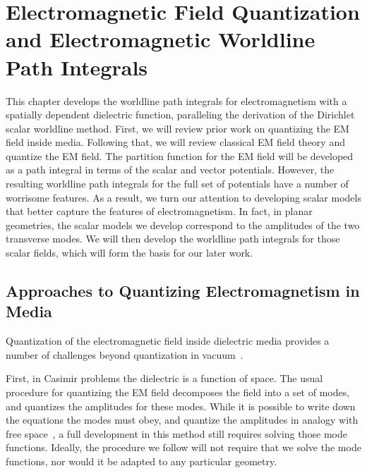 \chapter{Electromagnetic Field Quantization and Electromagnetic Worldline Path Integrals}

\label{ch:EM_quantization}

This chapter develops the worldline path integrals for electromagnetism with a spatially dependent
dielectric function, paralleling the derivation of the Dirichlet scalar worldline method.
First, we will review prior work on quantizing the EM field inside media.
Following that, we will review classical EM field theory and quantize the EM field.
The partition function for the EM field will be developed as a path integral in terms of the scalar and vector potentials.
However, the resulting worldline path integrals for the full set of potentials have a number of worrisome
features.  As a result, we turn our attention to developing scalar models that better capture the features
of electromagnetism.  In fact, in planar geometries, the scalar models we develop correspond to 
the amplitudes of the two transverse modes.  
We will then develop the worldline path integrals for those scalar fields, which will form
the basis for our later work.  

\section{Approaches to Quantizing Electromagnetism in Media}

Quantization of the electromagnetic field inside dielectric media provides a number of challenges 
beyond quantization in vacuum~\cite{Huttner1992,Dung1998,Bechler1999,Bordag1998,Rahi2009,Reid2013}.  

 First, in Casimir problems the dielectric is a function of space.  The usual procedure for
quantizing the EM field decomposes the field into a set of modes, and quantizes the amplitudes for these
modes.  While it is possible to write down the equations the modes must obey, and quantize the amplitudes
 in analogy with free space~\cite{Glauber1991}, a full development in this method still requires solving those mode functions.
 Ideally, the procedure we follow will not require that we solve the mode functions, 
 nor would it be adapted to any particular geometry.   

